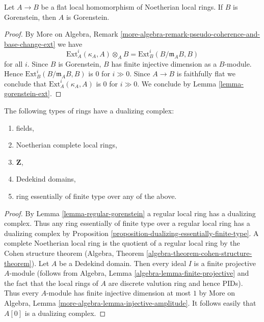 \begin{lemma}
\label{lemma-flat-under-gorenstein}
Let $A \to B$ be a flat local homomorphism of Noetherian local rings.
If $B$ is Gorenstein, then $A$ is Gorenstein.
\end{lemma}

\begin{proof}
By More on Algebra, Remark
\ref{more-algebra-remark-pseudo-coherence-and-base-change-ext}
we have
$$
\text{Ext}^i_A(\kappa_A, A) \otimes_A B =
\text{Ext}^i_B(B/\mathfrak m_A B, B)
$$
for all $i$. Since $B$ is Gorenstein, $B$ has finite injective dimension
as a $B$-module. Hence $\text{Ext}^i_B(B/\mathfrak m_A B, B)$
is $0$ for $i \gg 0$. Since $A \to B$ is faithfully flat
we conclude that $\text{Ext}^i_A(\kappa_A, A)$ is $0$
for $i \gg 0$. We conclude by Lemma \ref{lemma-gorenstein-ext}.
\end{proof}

\begin{lemma}
\label{lemma-ubiquity-dualizing}
The following types of rings have a dualizing complex:
\begin{enumerate}
\item fields,
\item Noetherian complete local rings,
\item $\mathbf{Z}$,
\item Dedekind domains,
\item ring essentially of finite type over any of the above.
\end{enumerate}
\end{lemma}

\begin{proof}
By Lemma \ref{lemma-regular-gorenstein} a regular local ring has a
dualizing complex. Thus any ring essentially of finite type over a
regular local ring has a dualizing complex by
Proposition \ref{proposition-dualizing-essentially-finite-type}.
A complete Noetherian local ring is the quotient of a regular
local ring by the Cohen structure theorem
(Algebra, Theorem \ref{algebra-theorem-cohen-structure-theorem}).
Let $A$ be a Dedekind domain. Then every ideal $I$ is a finite
projective $A$-module (follows from
Algebra, Lemma \ref{algebra-lemma-finite-projective}
and the fact that the local rings of $A$ are discrete valution ring
and hence PIDs). Thus every $A$-module has finite injective dimension
at most $1$ by
More on Algebra, Lemma \ref{more-algebra-lemma-injective-amplitude}.
It follows easily that $A[0]$ is a dualizing complex.
\end{proof}






